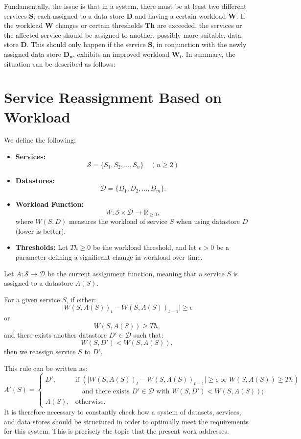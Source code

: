 \noindent Fundamentally, the issue is that in a system, there must be at least two different services $\mathbf{S}$, 
each assigned to a data store $\mathbf{D}$ and having a certain workload $\mathbf{W}$. 
If the workload $\mathbf{W}$ changes or certain thresholds $\mathbf{Th}$ are exceeded, 
the services or the affected service should be assigned to another, possibly more suitable, data store $\mathbf{D}$. 
This should only happen if the service $\mathbf{S}$, in conjunction with the newly assigned data store $\mathbf{D_n}$, exhibits an improved workload
$\mathbf{W_i}$.\noindent
In summary, the situation can be described as follows:
\section*{Service Reassignment Based on Workload}

We define the following:

\begin{itemize}
    \item \textbf{Services:} 
    \[
    \mathcal{S} = \{ S_1, S_2, \ldots, S_n \} \quad (n \geq 2)
    \]
    \item \textbf{Datastores:} 
    \[
    \mathcal{D} = \{ D_1, D_2, \ldots, D_m \}.
    \]
    \item \textbf{Workload Function:} 
    \[
    W: \mathcal{S} \times \mathcal{D} \to \mathbb{R}_{\ge0},
    \]
    where \(W(S,D)\) measures the workload of service \(S\) when using datastore \(D\) (lower is better).
    \item \textbf{Thresholds:} Let \(Th \ge 0\) be the workload threshold, and let \(\epsilon > 0\) be a parameter defining a significant change in workload over time.
\end{itemize}

Let \(A: \mathcal{S} \to \mathcal{D}\) be the current assignment function, meaning that a service \(S\) is assigned to a datastore \(A(S)\).

For a given service \(S\), if either:
\[
\bigl|W(S, A(S))_t - W(S, A(S))_{t-1}\bigr| \ge \epsilon
\]
or
\[
W(S, A(S)) \ge Th,
\]
and there exists another datastore \(D' \in \mathcal{D}\) such that:
\[
W(S, D') < W(S, A(S)),
\]
then we reassign service \(S\) to \(D'\).

This rule can be written as:
\[
A'(S) =
\begin{cases}
D', & \text{if } \left( \bigl|W(S, A(S))_t - W(S, A(S))_{t-1}\bigr| \ge \epsilon \text{ or } W(S, A(S)) \ge Th \right) \\
    & \quad \text{and there exists } D' \in \mathcal{D} \text{ with } W(S, D') < W(S, A(S)); \\[1ex]
A(S), & \text{otherwise.}
\end{cases}
\]
It is therefore necessary to constantly check how a system of datasets, services, and data stores should be structured 
in order to optimally meet the requirements for this system. 
This is precisely the topic that the present work addresses.
%
%
